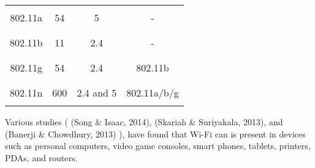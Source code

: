 \documentclass[12pt,svgnames,smaller]{article} %
\begin{document}
\begin{enumerate}
\begin{table} [ht]
\begin{tabular}{c | c | c | c}
				
				& & & \\[1ex]
				\hline
				& & & \\[1ex]
				
				
				802.11a & 54 & 5 & - \\
				
				
				& & & \\[1ex]
				\hline
				& & & \\[1ex]
				
				
				802.11b & 11 & 2.4 & - \\
				
				
				& & & \\[1ex]
				\hline
				& & & \\[1ex]
				
				
				802.11g & 54 & 2.4 & 802.11b \\
				
				
				& & & \\[1ex]
				\hline
				& & & \\[1ex]
				
				
				802.11n & 600 & 2.4 and 5 & 802.11a/b/g \\
				
				
				& & & \\[1ex]
				\hline
				
			\end{tabular}
			
			\label{table:802.11_comparisons}
			
		\end{table} %
		
		Various studies ( (Song \& Isaac, 2014), (Skariah \& Suriyakala, 2013), and (Banerji \& Chowdhury, 2013) ), have found that Wi-Fi can is present in devices such as personal computers, video game consoles, smart phones, tablets, printers, PDAs, and routers.
		

\end{enumerate}
\end{document}
